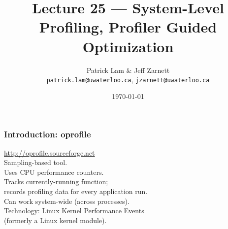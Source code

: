 

\title{Lecture 25 --- System-Level Profiling, Profiler Guided Optimization }

\author{Patrick Lam \& Jeff Zarnett \\ \small \texttt{patrick.lam@uwaterloo.ca}, \texttt{jzarnett@uwaterloo.ca}}
\date{\today}




\begin{frame}
  \titlepage

 \end{frame}






\begin{frame}
  \frametitle{Introduction: oprofile}

\large
\begin{changemargin}{1.5cm}

    \url{http://oprofile.sourceforge.net}\\[1em]

    Sampling-based tool.\\[1em]
    
    Uses CPU performance counters.\\[1em]

    Tracks currently-running function;\\
    records profiling data for every application run.\\[1em]

    Can work system-wide (across processes).\\[1em]

    Technology: Linux Kernel Performance Events\\ (formerly a Linux kernel module).
    \end{changemargin}
\end{frame}

